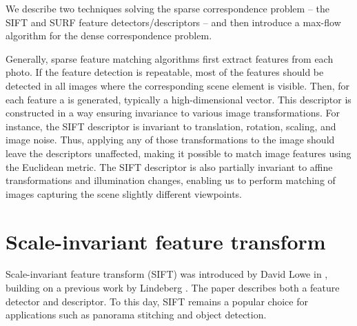 We describe two techniques solving the sparse correspondence problem -- the SIFT and SURF feature detectors/descriptors -- and then introduce a max-flow algorithm for the dense correspondence problem. 

Generally, sparse feature matching algorithms first extract features from each photo. %
If the feature detection is repeatable, most of the features should be detected in all images where the corresponding scene element is visible.
Then, for each feature a  is generated, typically a high-dimensional vector. 
This descriptor is constructed in a way ensuring invariance to various image transformations. 
For instance, the SIFT descriptor is invariant to translation, rotation, scaling, and image noise. 
Thus, applying any of those transformations to the image should leave the descriptors unaffected, making it possible to match image features using the Euclidean metric. 
The SIFT descriptor is also partially invariant to affine transformations and illumination changes, enabling us to perform matching of images capturing the scene slightly different viewpoints.
 
\section{Scale-invariant feature transform}
Scale-invariant feature transform (SIFT) was introduced by David Lowe in \cite{lowe1999}, building on a previous work by Lindeberg \cite{lindberg1998}.  %
The paper describes both a feature detector and descriptor.
To this day, SIFT remains a popular choice for applications such as panorama stitching and object detection.

